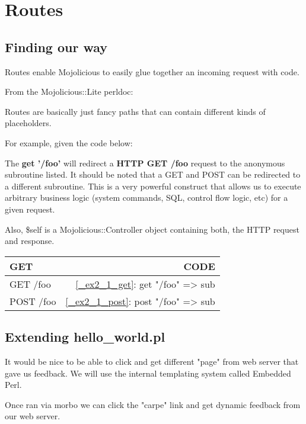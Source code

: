 \documentclass[17pt]{extreport}
\newcommand\Small{\fontsize{10}{10.2}\selectfont}
\newcommand*\LSTfont{\Small\ttfamily\SetTracking{encoding=*}{-60}\lsstyle}
\begin{document}
\section{Routes}

\subsection{Finding our way}

Routes enable Mojolicious to easily glue together an incoming request with
code.

From the Mojolicious::Lite perldoc:

Routes are basically just fancy paths that can contain different kinds of
placeholders.

For example, given the code below:



The \textbf{get '/foo'} will redirect a \textbf{HTTP GET /foo} request to the anonymous
subroutine listed. It should be noted that a GET and POST can be redirected to
a different subroutine.  This is a very powerful construct that allows us to
execute arbitrary business logic (system commands, SQL, control flow logic,
etc) for a given request.

Also, \$self is a Mojolicious::Controller object containing both, the HTTP
request and response.

\begin{center}
  \begin{tabular}{|l|r|}
    \hline
    GET  & CODE\\
    \hline
    GET /foo & \ref{_ex2_1_get}: get "/foo" => sub {}\\
    POST /foo & \ref{_ex2_1_post}: post "/foo" => sub {}\\
    \hline
  \end{tabular}
\end{center}

\subsection{Extending hello\_world.pl}

It would be nice to be able to click and get different "page" from web server
that gave us feedback. We will use the internal templating system called
Embedded Perl.



Once ran via morbo we can click the "carpe" link and get dynamic feedback from our web server.
\end{document}
